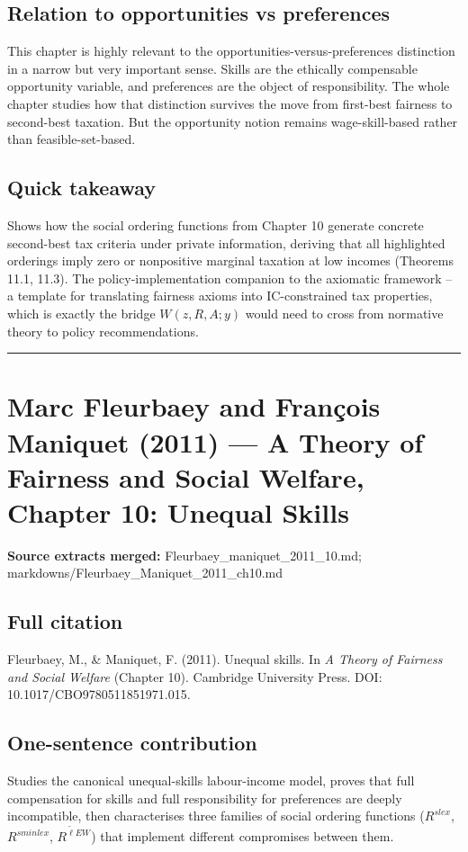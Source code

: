 \documentclass[11pt,a4paper]{article}
\begin{document}
\subsection*{Relation to opportunities vs preferences}
This chapter is highly relevant to the opportunities-versus-preferences distinction in a narrow but very important sense. Skills are the ethically compensable opportunity variable, and preferences are the object of responsibility. The whole chapter studies how that distinction survives the move from first-best fairness to second-best taxation. But the opportunity notion remains wage-skill-based rather than feasible-set-based.

\subsection*{Quick takeaway}
Shows how the social ordering functions from Chapter 10 generate concrete second-best tax criteria under private information, deriving that all highlighted orderings imply zero or nonpositive marginal taxation at low incomes (Theorems 11.1, 11.3). The policy-implementation companion to the axiomatic framework -- a template for translating fairness axioms into IC-constrained tax properties, which is exactly the bridge $W(z,R,A;y)$ would need to cross from normative theory to policy recommendations.


\medskip\hrule\medskip

\section*{Marc Fleurbaey and François Maniquet (2011) — A Theory of Fairness and Social Welfare, Chapter 10: Unequal Skills}

\textbf{Source extracts merged:} Fleurbaey\_maniquet\_2011\_10.md; markdowns/Fleurbaey\_Maniquet\_2011\_ch10.md

\subsection*{Full citation}
Fleurbaey, M., \& Maniquet, F. (2011). Unequal skills. In \textit{A Theory of Fairness and Social Welfare} (Chapter 10). Cambridge University Press. DOI: 10.1017/CBO9780511851971.015.

\subsection*{One-sentence contribution}
Studies the canonical unequal-skills labour-income model, proves that full compensation for skills and full responsibility for preferences are deeply incompatible, then characterises three families of social ordering functions ($R^{slex}$, $R^{sminlex}$, $R^{\tilde{\ell}EW}$) that implement different compromises between them.
\end{document}
